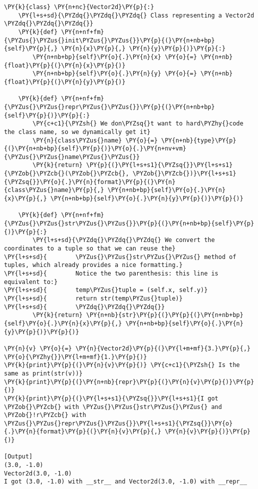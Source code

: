 \begin{Verbatim}[label=\makebox{\url{https://bitbucket.org/lbaldini/programming/src/tip/snippets/vector2d\_printable.py}},commandchars=\\\{\}]
\PY{k}{class} \PY{n+nc}{Vector2d}\PY{p}{:}
    \PY{l+s+sd}{\PYZdq{}\PYZdq{}\PYZdq{} Class representing a Vector2d \PYZdq{}\PYZdq{}\PYZdq{}}   
    \PY{k}{def} \PY{n+nf+fm}{\PYZus{}\PYZus{}init\PYZus{}\PYZus{}}\PY{p}{(}\PY{n+nb+bp}{self}\PY{p}{,} \PY{n}{x}\PY{p}{,} \PY{n}{y}\PY{p}{)}\PY{p}{:}
        \PY{n+nb+bp}{self}\PY{o}{.}\PY{n}{x} \PY{o}{=} \PY{n+nb}{float}\PY{p}{(}\PY{n}{x}\PY{p}{)}
        \PY{n+nb+bp}{self}\PY{o}{.}\PY{n}{y} \PY{o}{=} \PY{n+nb}{float}\PY{p}{(}\PY{n}{y}\PY{p}{)}
   
    \PY{k}{def} \PY{n+nf+fm}{\PYZus{}\PYZus{}repr\PYZus{}\PYZus{}}\PY{p}{(}\PY{n+nb+bp}{self}\PY{p}{)}\PY{p}{:}
        \PY{c+c1}{\PYZsh{} We don\PYZsq{}t want to hard\PYZhy{}code the class name, so we dynamically get it}
        \PY{n}{class\PYZus{}name} \PY{o}{=} \PY{n+nb}{type}\PY{p}{(}\PY{n+nb+bp}{self}\PY{p}{)}\PY{o}{.}\PY{n+nv+vm}{\PYZus{}\PYZus{}name\PYZus{}\PYZus{}}
        \PY{k}{return} \PY{p}{(}\PY{l+s+s1}{\PYZsq{}}\PY{l+s+s1}{\PYZob{}\PYZcb{}(\PYZob{}\PYZcb{}, \PYZob{}\PYZcb{})}\PY{l+s+s1}{\PYZsq{}}\PY{o}{.}\PY{n}{format}\PY{p}{(}\PY{n}{class\PYZus{}name}\PY{p}{,} \PY{n+nb+bp}{self}\PY{o}{.}\PY{n}{x}\PY{p}{,} \PY{n+nb+bp}{self}\PY{o}{.}\PY{n}{y}\PY{p}{)}\PY{p}{)}
        
    \PY{k}{def} \PY{n+nf+fm}{\PYZus{}\PYZus{}str\PYZus{}\PYZus{}}\PY{p}{(}\PY{n+nb+bp}{self}\PY{p}{)}\PY{p}{:}
        \PY{l+s+sd}{\PYZdq{}\PYZdq{}\PYZdq{} We convert the coordinates to a tuple so that we can reuse the}
\PY{l+s+sd}{        \PYZus{}\PYZus{}str\PYZus{}\PYZus{} method of tuples, which already provides a nice formatting.}
\PY{l+s+sd}{        Notice the two parenthesis: this line is equivalent to:}
\PY{l+s+sd}{        temp\PYZus{}tuple = (self.x, self.y)}
\PY{l+s+sd}{        return str(temp\PYZus{}tuple)}
\PY{l+s+sd}{        \PYZdq{}\PYZdq{}\PYZdq{}}
        \PY{k}{return} \PY{n+nb}{str}\PY{p}{(}\PY{p}{(}\PY{n+nb+bp}{self}\PY{o}{.}\PY{n}{x}\PY{p}{,} \PY{n+nb+bp}{self}\PY{o}{.}\PY{n}{y}\PY{p}{)}\PY{p}{)}
     
\PY{n}{v} \PY{o}{=} \PY{n}{Vector2d}\PY{p}{(}\PY{l+m+mf}{3.}\PY{p}{,} \PY{o}{\PYZhy{}}\PY{l+m+mf}{1.}\PY{p}{)}
\PY{k}{print}\PY{p}{(}\PY{n}{v}\PY{p}{)} \PY{c+c1}{\PYZsh{} Is the same as print(str(v))}
\PY{k}{print}\PY{p}{(}\PY{n+nb}{repr}\PY{p}{(}\PY{n}{v}\PY{p}{)}\PY{p}{)}
\PY{k}{print}\PY{p}{(}\PY{l+s+s1}{\PYZsq{}}\PY{l+s+s1}{I got \PYZob{}\PYZcb{} with \PYZus{}\PYZus{}str\PYZus{}\PYZus{} and \PYZob{}!r\PYZcb{} with \PYZus{}\PYZus{}repr\PYZus{}\PYZus{}}\PY{l+s+s1}{\PYZsq{}}\PY{o}{.}\PY{n}{format}\PY{p}{(}\PY{n}{v}\PY{p}{,} \PY{n}{v}\PY{p}{)}\PY{p}{)}

[Output]
(3.0, -1.0)
Vector2d(3.0, -1.0)
I got (3.0, -1.0) with __str__ and Vector2d(3.0, -1.0) with __repr__
\end{Verbatim}